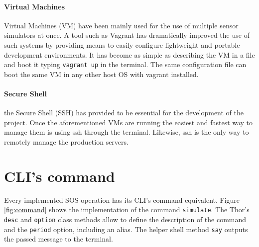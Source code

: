 \paragraph{Virtual Machines} Virtual Machines (VM) have been mainly used for the use of multiple sensor simulators at once. A tool such as Vagrant has dramatically improved the use of such systems by providing means to easily configure lightweight and portable development environments. It has become as simple as describing the VM in a file and boot it typing \texttt{vagrant up} in the terminal. The same configuration file can boot the same VM in any other host OS with vagrant installed.


\paragraph{Secure Shell} the Secure Shell (SSH) has provided to be essential for the development of the project. Once the aforementioned VMs are running the easiest and fastest way to manage them is using ssh through the terminal. Likewise, ssh is the only way to remotely manage the production servers.

\section{CLI's command}

Every implemented SOS operation has its CLI's command equivalent. Figure \ref{fig:command} shows the implementation of the command \texttt{simulate}. The Thor's \texttt{desc} and \texttt{option} class methods allow to define the description of the command and the \texttt{period} option, including an alias. The helper shell method \texttt{say} outputs the passed message to the terminal.

